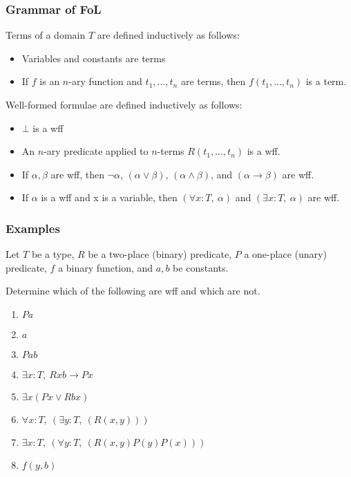 \documentclass{beamer}
\theoremstyle{indentDefn} \newtheorem{defn}[]{Definition}
\begin{document}
\begin{frame}
	\frametitle{Grammar of FoL}
	
	Terms of a domain $T$ are defined inductively as follows: 
	
	\begin{itemize}
		\item Variables and constants are terms
		\item If $f$ is an $n$-ary function and $t_{1}, ... , t_{n}$ are terms, then $f(t_{1}, ... , t_{n})$ is a term.
	\end{itemize}


	\vspace{0.2cm}

	Well-formed formulae are defined inductively as follows: 
	
	\begin{itemize}
		\item $\bot$ is a wff
		\item An $n$-ary predicate applied to $n$-terms $R(t_{1}, ... , t_{n})$ is a wff.
		\item If $\alpha, \beta$ are wff, then $\lnot \alpha$, $(\alpha \lor \beta)$, $(\alpha \land \beta)$, and $(\alpha \rightarrow \beta)$ are wff.
		\item If $\alpha$ is a wff and x is a variable, then $(\forall x : T, \ \alpha)$ and $(\exists x :T, \ \alpha)$ are wff. 
	\end{itemize}
\end{frame}



\begin{frame}
	\frametitle{Examples}
	
	Let $T$ be a type, $R$ be a two-place (binary) predicate, $P$ a one-place (unary) predicate, $f$ a binary function, and $a,b$ be constants. 
	
	\vspace{0.5cm}
	
	Determine which of the following are wff and which are not. 
	
	\begin{enumerate}
		\item $Pa$
		\item $a$
		\item $Pab$
		\item $\exists x : T, \ Rxb \rightarrow Px$
		\item $\exists x (Px \lor Rbx)$
		\item $\forall x : T, \ (\exists y : T, \ (R(x,y)))$
		\item $\exists x : T, \ (\forall y : T, \ (R(x,y)P(y)P(x)))$
		\item $f(y,b)$
	\end{enumerate}
\end{frame}
\end{document}
